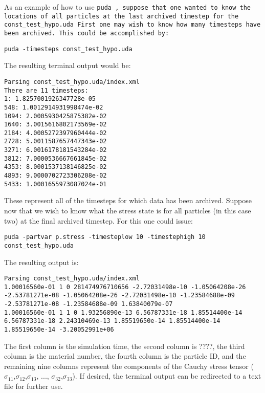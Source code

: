 As an example of how to use \tt puda \normalfont, suppose that one wanted to know the locations of all particles at the last archived timestep for the 
\tt const\_test\_hypo.uda \normalfont 
First one may wish to know how many timesteps have been archived.
This could be accomplished by:

\begin{Verbatim}[fontsize=\footnotesize]
 puda -timesteps const_test_hypo.uda
\end{Verbatim}
The resulting terminal output would be:
\begin{Verbatim}[fontsize=\footnotesize]
Parsing const_test_hypo.uda/index.xml
There are 11 timesteps:
1: 1.8257001926347728e-05
548: 1.0012914931998474e-02
1094: 2.0005930425875382e-02
1640: 3.0015616802173569e-02
2184: 4.0005272397960444e-02
2728: 5.0011587657447343e-02
3271: 6.0016178181543284e-02
3812: 7.0000536667661845e-02
4353: 8.0001537138146825e-02
4893: 9.0000702723306208e-02
5433: 1.0001655973087024e-01
\end{Verbatim}

These represent all of the timesteps for which data has been archived.  Suppose now that we wish to know what the stress state is for all particles (in this case two) at the final archived timestep.  For this one could issue:

\begin{Verbatim}[fontsize=\footnotesize]
puda -partvar p.stress -timesteplow 10 -timestephigh 10 const_test_hypo.uda
\end{Verbatim}

The resulting output is:

\begin{Verbatim}[fontsize=\footnotesize]
Parsing const_test_hypo.uda/index.xml
1.00016560e-01 1 0 281474976710656 -2.72031498e-10 -1.05064208e-26 -2.53781271e-08 -1.05064208e-26 -2.72031498e-10 -1.23584688e-09 -2.53781271e-08 -1.23584688e-09 1.63840079e-07
1.00016560e-01 1 1 0 1.93256890e-13 6.56787331e-18 1.85514400e-14 6.56787331e-18 2.24310469e-13 1.85519650e-14 1.85514400e-14 1.85519650e-14 -3.20052991e+06
\end{Verbatim}

The first column is the simulation time, the second column is ????, the third column is the material number, the fourth column is the particle ID, and the remaining nine columns represent the components of the Cauchy stress tensor ($ \sigma_{11}$,$\sigma_{12}$,$\sigma_{13}$, ..., $\sigma_{32}$,$\sigma_{33}$).  If desired, the terminal output can be redirected to a text file for further use.

